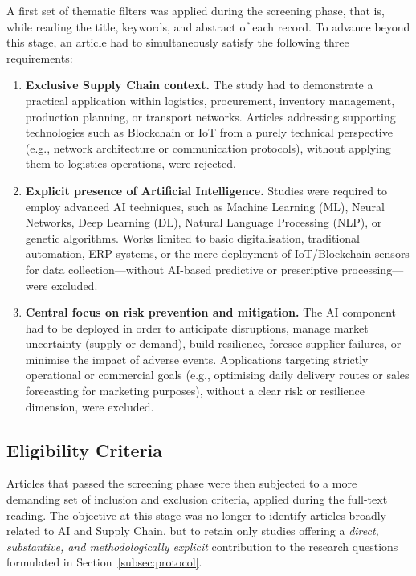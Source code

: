 A first set of thematic filters was applied during the screening phase, that is, while reading the title, keywords, and abstract of each record. To advance beyond this stage, an article had to simultaneously satisfy the following three requirements:

\begin{enumerate}
    \item \textbf{Exclusive Supply Chain context.} The study had to demonstrate a practical application within logistics, procurement, inventory management, production planning, or transport networks. Articles addressing supporting technologies such as Blockchain or IoT from a purely technical perspective (e.g., network architecture or communication protocols), without applying them to logistics operations, were rejected.
    \item \textbf{Explicit presence of Artificial Intelligence.} Studies were required to employ advanced AI techniques, such as Machine Learning (ML), Neural Networks, Deep Learning (DL), Natural Language Processing (NLP), or genetic algorithms. Works limited to basic digitalisation, traditional automation, ERP systems, or the mere deployment of IoT/Blockchain sensors for data collection---without AI-based predictive or prescriptive processing---were excluded.
    \item \textbf{Central focus on risk prevention and mitigation.} The AI component had to be deployed in order to anticipate disruptions, manage market uncertainty (supply or demand), build resilience, foresee supplier failures, or minimise the impact of adverse events. Applications targeting strictly operational or commercial goals (e.g., optimising daily delivery routes or sales forecasting for marketing purposes), without a clear risk or resilience dimension, were excluded.
\end{enumerate}

\subsection{Eligibility Criteria}
\label{subsec:eligibility-criteria}

Articles that passed the screening phase were then subjected to a more demanding set of inclusion and exclusion criteria, applied during the full-text reading. The objective at this stage was no longer to identify articles broadly related to AI and Supply Chain, but to retain only studies offering a \textit{direct, substantive, and methodologically explicit} contribution to the research questions formulated in Section~\ref{subsec:protocol}.

